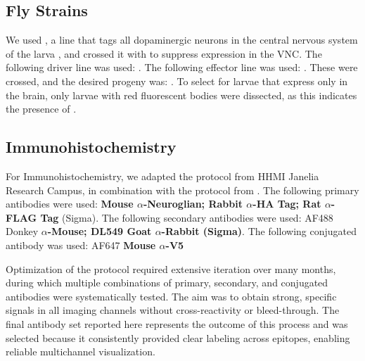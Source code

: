     \subsection{Fly Strains}
    We used , a line that tags all dopaminergic neurons in the central nervous system of the larva \citep{selcho2009thgal4}, and crossed it with  to suppress expression in the VNC. 
    The following driver line was used:  
    .
    The following effector line was used:   .
    These were crossed, and the desired progeny was:  . To select for larvae that express  only in the brain, only larvae with red fluorescent bodies were dissected, as this indicates the presence of .  
    

    \subsection{Immunohistochemistry}
    For Immunohistochemistry, we adapted the protocol from HHMI Janelia Research Campus, in combination with the protocol from \citep{nern2015multicolor}. The following primary antibodies were used: \textbf{Mouse $\alpha$-Neuroglian; Rabbit $\alpha$-HA Tag; Rat $\alpha$-FLAG Tag} (Sigma). The following secondary antibodies were used: AF488 Donkey \textbf{$\alpha$-Mouse; DL549 Goat $\alpha$-Rabbit (Sigma)}. The following conjugated antibody was used: AF647 \textbf{Mouse $\alpha$-V5} 

    Optimization of the protocol required extensive iteration over many months, during which multiple combinations of primary, secondary, and conjugated antibodies were systematically tested. The aim was to obtain strong, specific signals in all imaging channels without cross-reactivity or bleed-through. The final antibody set reported here represents the outcome of this process and was selected because it consistently provided clear labeling across epitopes, enabling reliable multichannel visualization.

